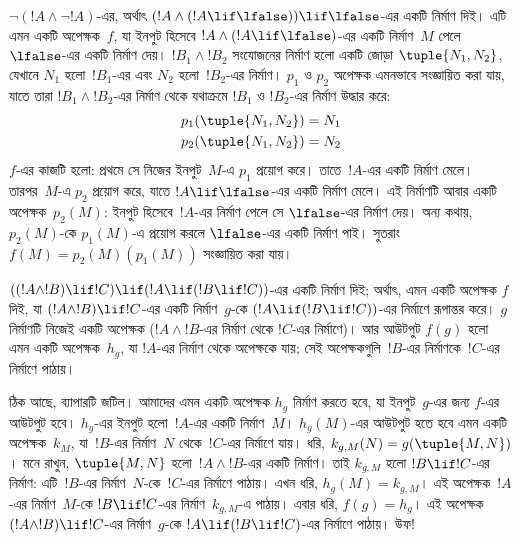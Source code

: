 \documentclass[../../../include/open-logic-section]{subfiles}
\begin{document}
\begin{ex}
$\lnot(!A \land \lnot !A)$-এর, অর্থাৎ $(!A
\land (!A \lif \lfalse)) \lif \lfalse$-এর একটি নির্মাণ দিই। এটি
এমন একটি অপেক্ষক~$f$, যা ইনপুট হিসেবে $!A \land (!A \lif \lfalse)$-এর
একটি নির্মাণ~$M$ পেলে $\lfalse$-এর একটি নির্মাণ দেয়। $!B_1 \land
!B_2$ সংযোজনের নির্মাণ হলো একটি জোড়া $\tuple{N_1, N_2}$, যেখানে
$N_1$ হলো~$!B_1$-এর এবং $N_2$ হলো~$!B_2$-এর নির্মাণ। $p_1$ ও $p_2$
অপেক্ষক এমনভাবে সংজ্ঞায়িত করা যায়, যাতে তারা $!B_1 \land !B_2$-এর
নির্মাণ থেকে যথাক্রমে $!B_1$ ও $!B_2$-এর নির্মাণ উদ্ধার করে:
\begin{align*}
  p_1(\tuple{N_1, N_2}) &= N_1\\
  p_2(\tuple{N_1, N_2}) &= N_2
\end{align*}
$f$-এর কাজটি হলো: প্রথমে সে নিজের ইনপুট~$M$-এ $p_1$ প্রয়োগ করে।
তাতে~$!A$-এর একটি নির্মাণ মেলে। তারপর~$M$-এ $p_2$ প্রয়োগ করে,
যাতে $!A \lif \lfalse$-এর একটি নির্মাণ মেলে। এই নির্মাণটি আবার
একটি অপেক্ষক~$p_2(M)$: ইনপুট হিসেবে~$!A$-এর নির্মাণ পেলে সে
$\lfalse$-এর নির্মাণ দেয়। অন্য কথায়, $p_2(M)$-কে $p_1(M)$-এ
প্রয়োগ করলে $\lfalse$-এর একটি নির্মাণ পাই। সুতরাং
$f(M) = p_2(M)(p_1(M))$ সংজ্ঞায়িত করা যায়।
\end{ex}

\begin{ex}
$((!A \land !B) \lif !C) \lif (!A \lif
(!B \lif !C))$-এর একটি নির্মাণ দিই; অর্থাৎ, এমন একটি অপেক্ষক $f$
দিই, যা $(!A \land !B) \lif !C$-এর একটি নির্মাণ~$g$-কে
$(!A \lif (!B \lif !C))$-এর নির্মাণে রূপান্তর করে।
$g$ নির্মাণটি নিজেই একটি অপেক্ষক ($!A \land !B$-এর নির্মাণ থেকে
$!C$-এর নির্মাণে)। আর আউটপুট $f(g)$ হলো এমন একটি অপেক্ষক~$h_g$,
যা $!A$-এর নির্মাণ থেকে অপেক্ষকে যায়; সেই অপেক্ষকগুলি~$!B$-এর
নির্মাণকে~$!C$-এর নির্মাণে পাঠায়।

ঠিক আছে, ব্যাপারটি জটিল। আমাদের এমন একটি অপেক্ষক $h_g$ নির্মাণ
করতে হবে, যা ইনপুট~$g$-এর জন্য $f$-এর আউটপুট হবে। $h_g$-এর ইনপুট
হলো~$!A$-এর একটি নির্মাণ~$M$। $h_g(M)$-এর আউটপুট হতে হবে এমন একটি
অপেক্ষক~$k_M$, যা~$!B$-এর নির্মাণ~$N$ থেকে~$!C$-এর নির্মাণে যায়।
ধরি, $k_{g,M}(N) = g(\tuple{M, N})$। মনে রাখুন, $\tuple{M,
  N}$ হলো~$!A \land !B$-এর একটি নির্মাণ। তাই $k_{g,M}$ হলো
$!B \lif !C$-এর নির্মাণ: এটি~$!B$-এর নির্মাণ~$N$-কে~$!C$-এর
নির্মাণে পাঠায়। এখন ধরি, $h_g(M) = k_{g,M}$। এই অপেক্ষক~$!A$-এর
নির্মাণ~$M$-কে $!B \lif !C$-এর নির্মাণ~$k_{g,M}$-এ পাঠায়। এবার
ধরি, $f(g) = h_g$। এই অপেক্ষক $(!A \land !B) \lif !C$-এর
নির্মাণ~$g$-কে $!A \lif (!B \lif !C)$-এর নির্মাণে পাঠায়। উফ!{}
\end{ex}
\end{document}
